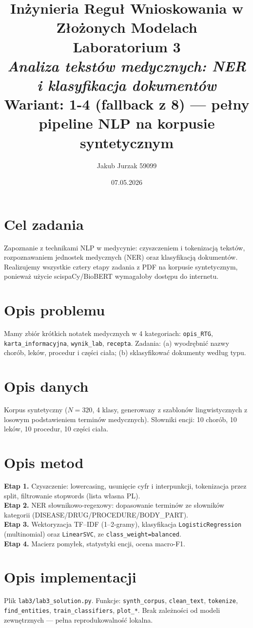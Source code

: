 \documentclass[12pt,a4paper]{article}
\title{
  \vspace{2cm}
  \LARGE\textbf{Inżynieria Reguł Wnioskowania w Złożonych Modelach}\\[0.6cm]
  \Large Laboratorium 3\\[0.4cm]
  \large \textit{Analiza tekstów medycznych: NER i klasyfikacja dokumentów}\\[0.3cm]
  \normalsize Wariant: \textbf{1-4 (fallback z 8) — pełny pipeline NLP na korpusie syntetycznym}
}
\author{Jakub Jurzak 59099}
\date{07.05.2026}
\begin{document}
\maketitle
\thispagestyle{empty}
\newpage

\tableofcontents
\newpage

\section{Cel zadania}
Zapoznanie z technikami NLP w medycynie: czyszczeniem i tokenizacją tekstów, rozpoznawaniem jednostek medycznych (NER) oraz klasyfikacją dokumentów. Realizujemy wszystkie cztery etapy zadania z PDF na korpusie syntetycznym, ponieważ użycie scispaCy/BioBERT wymagałoby dostępu do internetu.

\section{Opis problemu}
Mamy zbiór krótkich notatek medycznych w 4 kategoriach: \texttt{opis\_RTG}, \texttt{karta\_informacyjna}, \texttt{wynik\_lab}, \texttt{recepta}. Zadania: (a) wyodrębnić nazwy chorób, leków, procedur i części ciała; (b) sklasyfikować dokumenty według typu.

\section{Opis danych}
Korpus syntetyczny ($N=320$, 4 klasy, generowany z szablonów lingwistycznych z losowym podstawieniem terminów medycznych). Słowniki encji: 10 chorób, 10 leków, 10 procedur, 10 części ciała.

\section{Opis metod}
\textbf{Etap 1.} Czyszczenie: lowercasing, usunięcie cyfr i interpunkcji, tokenizacja przez split, filtrowanie stopwords (lista własna PL).\\\textbf{Etap 2.} NER słownikowo-regexowy: dopasowanie terminów ze słowników kategorii (DISEASE/DRUG/PROCEDURE/BODY\_PART).\\\textbf{Etap 3.} Wektoryzacja TF--IDF (1--2-gramy), klasyfikacja \texttt{LogisticRegression} (multinomial) oraz \texttt{LinearSVC}, ze \texttt{class\_weight=balanced}.\\\textbf{Etap 4.} Macierz pomyłek, statystyki encji, ocena macro-F1.

\section{Opis implementacji}
Plik \texttt{lab3/lab3\_solution.py}. Funkcje: \texttt{synth\_corpus}, \texttt{clean\_text}, \texttt{tokenize}, \texttt{find\_entities}, \texttt{train\_classifiers}, \texttt{plot\_*}. Brak zależności od modeli zewnętrznych --- pełna reprodukowalność lokalna.
\end{document}
